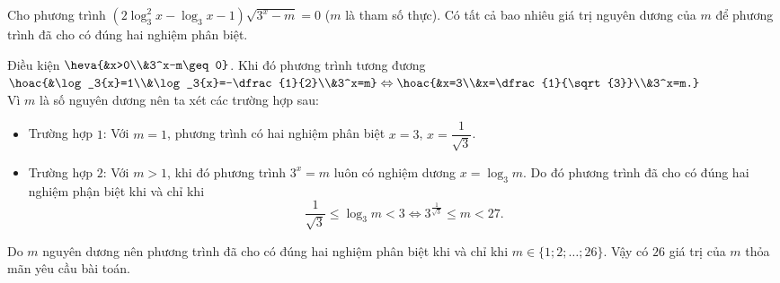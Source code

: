 \begin{ex}%
	Cho phương trình $\left(2\log_3^{2}x-\log_3x-1 \right)\sqrt{3^x-m}=0$ ($m$ là tham số thực). Có tất cả bao nhiêu giá trị nguyên dương của $m$ để phương trình đã cho có đúng hai nghiệm phân biệt.
	\loigiai
	{Điều kiện $\heva{&x>0\\&3^x-m\geq 0}$. Khi đó phương trình tương đương $\hoac{&\log_3{x}=1\\&\log_3{x}=-\dfrac{1}{2}\\&3^x=m} \Leftrightarrow \hoac{&x=3\\&x=\dfrac{1}{\sqrt{3}}\\&3^x=m.}$\\
		Vì $m$ là số nguyên dương nên ta xét các trường hợp sau:
		\begin{itemize}
			\item Trường hợp $1$: Với $m=1$, phương trình có hai nghiệm phân biệt $x=3$, $x=\dfrac{1}{\sqrt{3}}$.
			\item Trường hợp $2$: Với $m>1$, khi đó phương trình $3^x=m$ luôn có nghiệm dương $x=\log_3{m}$. Do đó phương trình đã cho có đúng hai nghiệm phận biệt khi và chỉ khi
			$$\dfrac{1}{\sqrt{3}}\leq \log_3{m}<3 \Leftrightarrow 3^{\tfrac{1}{\sqrt{3}}} \leq m <27.$$
		\end{itemize}
		Do $m$ nguyên dương nên phương trình đã cho có đúng hai nghiệm phân biệt khi và chỉ khi $m\in \{1;2;\ldots;26\}$. Vậy có $26$ giá trị của $m$ thỏa mãn yêu cầu bài toán.
	}
\end{ex}
